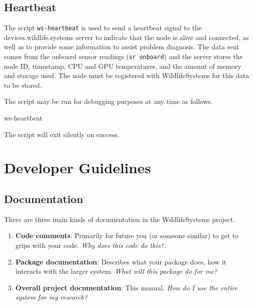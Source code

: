 \documentclass[
]{book}
\newenvironment{Shaded}{\begin{snugshade}}{\end{snugshade}}
\newcommand{\ExtensionTok}[1]{#1}
\begin{document}
\hypertarget{heartbeat}{%
\section{Heartbeat}\label{heartbeat}}

The script \texttt{ws-heartbeat} is used to send a heartbeat signal to the devices.wildlife.systems server to indicate that the node is alive and connected, as well as to provide some information to assist problem diagnosis. The data sent comes from the onboard sensor readings (\texttt{sr\ onboard}) and the server stores the node ID, timestamp, CPU and GPU temperatures, and the amount of memory and storage used. The node must be registered with WildlifeSystems for this data to be stored.

The script may be run for debugging purposes at any time as follows.

\begin{Shaded}
\begin{Highlighting}[]
\ExtensionTok{ws{-}heartbeat}
\end{Highlighting}
\end{Shaded}

The script will exit silently on success.

\hypertarget{developer-guidelines}{%
\chapter{Developer Guidelines}\label{developer-guidelines}}

\hypertarget{documentation}{%
\section{Documentation}\label{documentation}}

There are three main kinds of documentation in the WildlifeSystems project.

\begin{enumerate}
\def\labelenumi{\arabic{enumi}.}
\item
  \textbf{Code comments}: Primarily for future you (or someone similar) to get to grips with your code. \emph{Why does this code do this?}.
\item
  \textbf{Package documentation}: Describes what your package does, how it interacts with the larger system. \emph{What will this package do for me?}
\item
  \textbf{Overall project documentation}: This manual. \emph{How do I use the entire system for my research?}
\end{enumerate}
\end{document}
